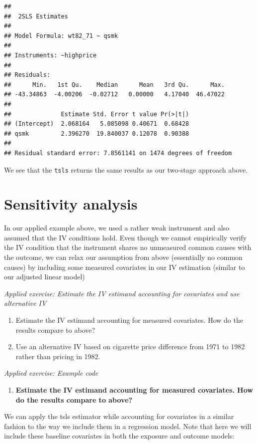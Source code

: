 \documentclass[
]{book}
\providecommand{\tightlist}{%
  \setlength{\itemsep}{0pt}\setlength{\parskip}{0pt}}
\begin{document}
\begin{verbatim}
## 
##  2SLS Estimates
## 
## Model Formula: wt82_71 ~ qsmk
## 
## Instruments: ~highprice
## 
## Residuals:
##      Min.   1st Qu.    Median      Mean   3rd Qu.      Max. 
## -43.34863  -4.00206  -0.02712   0.00000   4.17040  46.47022 
## 
##              Estimate Std. Error t value Pr(>|t|)
## (Intercept)  2.068164   5.085098 0.40671  0.68428
## qsmk         2.396270  19.840037 0.12078  0.90388
## 
## Residual standard error: 7.8561141 on 1474 degrees of freedom
\end{verbatim}

We see that the \texttt{tsls} returns the same results as our two-stage approach above.

\section{Sensitivity analysis}\label{sensitivity-analysis}

In our applied example above, we used a rather weak instrument and also assumed that the IV conditions hold. Even though we cannot empirically verify the IV condition that the instrument shares no unmeasured common causes with the outcome, we can relax our assumption from above (essentially no common causes) by including some measured covariates in our IV estimation (similar to our adjusted linear model)

\emph{Applied exercise: Estimate the IV estimand accounting for covariates and use alternative IV}

\begin{enumerate}
\def\labelenumi{\arabic{enumi}.}
\tightlist
\item
  Estimate the IV estimand accounting for measured covariates. How do the results compare to above?
\item
  Use an alternative IV based on cigarette price difference from 1971 to 1982 rather than pricing in 1982.
\end{enumerate}

\emph{Applied exercise: Example code}

\begin{enumerate}
\def\labelenumi{\arabic{enumi}.}
\tightlist
\item
  \textbf{Estimate the IV estimand accounting for measured covariates. How do the results compare to above?}
\end{enumerate}

We can apply the tsls estimator while accounting for covariates in a similar fashion to the way we include them in a regression model. Note that here we will include these baseline covariates in both the exposure and outcome models:
\end{document}
